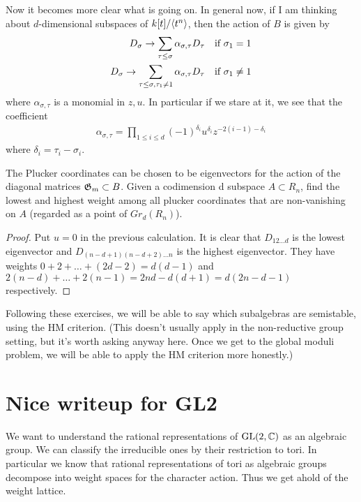 \documentclass[12pt]{article}
\begin{document}
Now it becomes more clear what is going on. In general now, if I am thinking about 
$d$-dimensional subspaces of $k[t]/\langle{t^n}\rangle$, then the action of $B$ is given by
\begin{align*}
    D_{\sigma} \to \sum_{\tau\leq \sigma} \alpha_{\sigma,\tau}D_\tau \text{\quad if $\sigma_1 = 1$} \\
    D_{\sigma} \to  \sum_{\tau\leq \sigma,\tau_1\neq 1} \alpha_{\sigma,\tau}D_\tau \text{\quad if $\sigma_1 \neq 1$}
\end{align*} where $\alpha_{\sigma,\tau}$ is a monomial in $z,u$. In particular if we stare at it, we see that
the coefficient \begin{align*}
    \alpha_{\sigma,\tau} = \prod_{1\leq i \leq d} (-1)^{\delta_i}u^{\delta_i}z^{-2(i-1)-\delta_i}
\end{align*} where $\delta_i = \tau_i - \sigma_i$.
\begin{exercise}
    The Plucker coordinates can be chosen to be eigenvectors for the action of the diagonal matrices $\mathfrak{G}_m \subset B$. 
    Given a codimension d subspace $A \subset R_n$, find the lowest and highest weight among all plucker coordinates that are non-vanishing on $A$ 
    (regarded as a point of $Gr_d(R_n)$).
\end{exercise}

\begin{proof}
    Put $u=0$ in the previous calculation. It is clear that $D_{12\dots d}$ is the lowest eigenvector
    and $D_{(n-d+1)(n-d+2)\dots n}$ is the highest eigenvector. 
    They have weights $0 + 2 + \dots + (2d-2) = d(d-1)$
    and $2(n-d) + \dots + 2(n-1) = 2nd - d(d+1) = d(2n-d-1)$ respectively.
\end{proof}


\begin{remark}
    Following these exercises, we will be able to say which subalgebras are semistable, using the HM criterion.
     (This doesn't usually apply in the non-reductive group setting, but it's worth asking anyway here. 
     Once we get to the global moduli problem, we will be able to apply the HM criterion more honestly.)
\end{remark}

\section{Nice writeup for GL2}
We want to understand the rational representations of $\operatorname{GL}(2,\mathbb{C})$ as an algebraic group. We can classify the irreducible ones by their restriction to tori. In particular 
we know that rational representations of tori as algebraic groups decompose into weight spaces for the character action. Thus we get ahold of the weight lattice. 
\end{document}
